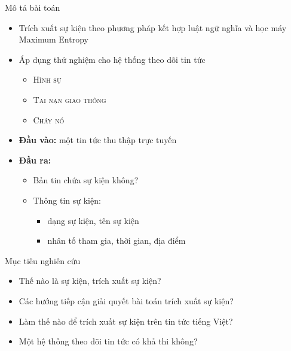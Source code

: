 \documentclass{beamer}
\numberwithin{equation}{section}
\begin{document}
    \begin{frame}{Mô tả bài toán}
      \begin{itemize}
       \item Trích xuất sự kiện theo phương pháp kết hợp luật ngữ nghĩa  và học máy Maximum Entropy
\pause
\item Áp dụng thử nghiệm cho hệ thống theo dõi tin tức
         \begin{itemize}
           \item \textsc{Hình sự}
             \item \textsc{Tai nạn giao thông}
               \item \textsc{Cháy nổ}
          \end{itemize}
        \medskip
        \pause
        \item \textbf{Đầu vào:} một tin tức thu thập trực tuyến
          \pause
        \item \textbf{Đầu ra:}
          \begin{itemize}
            \item Bản tin chứa sự kiện không?
              \pause
              \item Thông tin sự kiện:
                \begin{itemize}
                  \item dạng sự kiện, tên sự kiện
                    \item nhân tố tham gia, thời gian, địa điểm
                 \end{itemize}
          \end{itemize}
      \end{itemize}
    \end{frame}

    \begin{frame}{Mục tiêu nghiên cứu}
      \begin{itemize}
        \item Thế nào là sự kiện, trích xuất sự kiện?
          \medskip
          \item Các hướng tiếp cận giải quyết bài toán trích xuất sự kiện?
            \medskip
          \item Làm thế nào để trích xuất sự kiện trên tin tức tiếng Việt?
            \medskip
          \item Một hệ thống theo dõi tin tức có khả thi không?
        \end{itemize}

      \end{frame}
\end{document}
